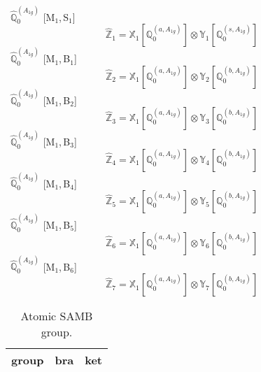 \documentclass[fleqn,10pt,landscape]{article}
\begin{document}
\begin{itemize}
\vspace{4mm}
\noindent {} $\,\,\,\hat{\mathbb{Q}}_{0}^{(A_{1g})}$ [M$_{1}$,\,S$_{1}$]
\begin{dmath*}
\hat{\mathbb{Z}}_{1}=\mathbb{X}_{1}[\mathbb{Q}_{0}^{(a,A_{1g})}] \otimes\mathbb{Y}_{1}[\mathbb{Q}_{0}^{(s,A_{1g})}]
\end{dmath*}
\vspace{4mm}
\noindent {} $\,\,\,\hat{\mathbb{Q}}_{0}^{(A_{1g})}$ [M$_{1}$,\,B$_{1}$]
\begin{dmath*}
\hat{\mathbb{Z}}_{2}=\mathbb{X}_{1}[\mathbb{Q}_{0}^{(a,A_{1g})}] \otimes\mathbb{Y}_{2}[\mathbb{Q}_{0}^{(b,A_{1g})}]
\end{dmath*}
\vspace{4mm}
\noindent {} $\,\,\,\hat{\mathbb{Q}}_{0}^{(A_{1g})}$ [M$_{1}$,\,B$_{2}$]
\begin{dmath*}
\hat{\mathbb{Z}}_{3}=\mathbb{X}_{1}[\mathbb{Q}_{0}^{(a,A_{1g})}] \otimes\mathbb{Y}_{3}[\mathbb{Q}_{0}^{(b,A_{1g})}]
\end{dmath*}
\vspace{4mm}
\noindent {} $\,\,\,\hat{\mathbb{Q}}_{0}^{(A_{1g})}$ [M$_{1}$,\,B$_{3}$]
\begin{dmath*}
\hat{\mathbb{Z}}_{4}=\mathbb{X}_{1}[\mathbb{Q}_{0}^{(a,A_{1g})}] \otimes\mathbb{Y}_{4}[\mathbb{Q}_{0}^{(b,A_{1g})}]
\end{dmath*}
\vspace{4mm}
\noindent {} $\,\,\,\hat{\mathbb{Q}}_{0}^{(A_{1g})}$ [M$_{1}$,\,B$_{4}$]
\begin{dmath*}
\hat{\mathbb{Z}}_{5}=\mathbb{X}_{1}[\mathbb{Q}_{0}^{(a,A_{1g})}] \otimes\mathbb{Y}_{5}[\mathbb{Q}_{0}^{(b,A_{1g})}]
\end{dmath*}
\vspace{4mm}
\noindent {} $\,\,\,\hat{\mathbb{Q}}_{0}^{(A_{1g})}$ [M$_{1}$,\,B$_{5}$]
\begin{dmath*}
\hat{\mathbb{Z}}_{6}=\mathbb{X}_{1}[\mathbb{Q}_{0}^{(a,A_{1g})}] \otimes\mathbb{Y}_{6}[\mathbb{Q}_{0}^{(b,A_{1g})}]
\end{dmath*}
\vspace{4mm}
\noindent {} $\,\,\,\hat{\mathbb{Q}}_{0}^{(A_{1g})}$ [M$_{1}$,\,B$_{6}$]
\begin{dmath*}
\hat{\mathbb{Z}}_{7}=\mathbb{X}_{1}[\mathbb{Q}_{0}^{(a,A_{1g})}] \otimes\mathbb{Y}_{7}[\mathbb{Q}_{0}^{(b,A_{1g})}]
\end{dmath*}
\begin{center}
\renewcommand{\arraystretch}{1.3}
\begin{longtable}{c|c|c}
\caption{Atomic SAMB group.}
 \\
 \hline \hline
group & bra & ket \\ \hline \endfirsthead


\end{longtable}
\end{center}
\end{itemize}
\end{document}
